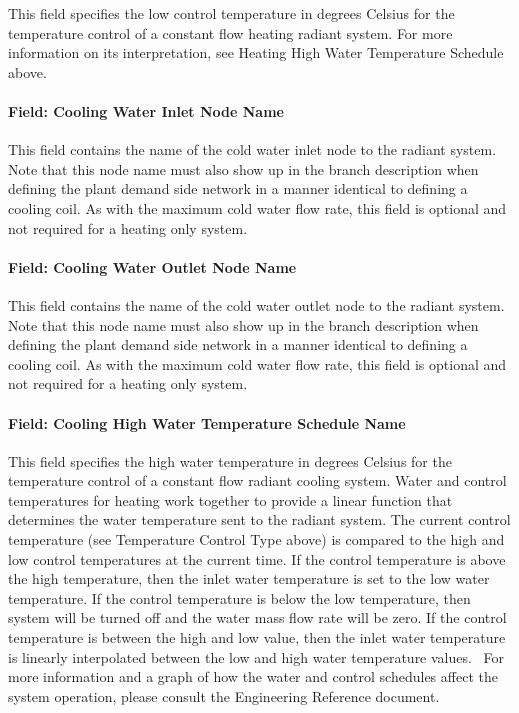 This field specifies the low control temperature in degrees Celsius for the temperature control of a constant flow heating radiant system. For more information on its interpretation, see Heating High Water Temperature Schedule above.

\paragraph{Field: Cooling Water Inlet Node Name}\label{field-cooling-water-inlet-node-name-1}

This field contains the name of the cold water inlet node to the radiant system. Note that this node name must also show up in the branch description when defining the plant demand side network in a manner identical to defining a cooling coil. As with the maximum cold water flow rate, this field is optional and not required for a heating only system.

\paragraph{Field: Cooling Water Outlet Node Name}\label{field-cooling-water-outlet-node-name-1}

This field contains the name of the cold water outlet node to the radiant system. Note that this node name must also show up in the branch description when defining the plant demand side network in a manner identical to defining a cooling coil. As with the maximum cold water flow rate, this field is optional and not required for a heating only system.

\paragraph{Field: Cooling High Water Temperature Schedule Name}\label{field-cooling-high-water-temperature-schedule-name}

This field specifies the high water temperature in degrees Celsius for the temperature control of a constant flow radiant cooling system. Water and control temperatures for heating work together to provide a linear function that determines the water temperature sent to the radiant system. The current control temperature (see Temperature Control Type above) is compared to the high and low control temperatures at the current time. If the control temperature is above the high temperature, then the inlet water temperature is set to the low water temperature. If the control temperature is below the low temperature, then system will be turned off and the water mass flow rate will be zero. If the control temperature is between the high and low value, then the inlet water temperature is linearly interpolated between the low and high water temperature values.~ For more information and a graph of how the water and control schedules affect the system operation, please consult the Engineering Reference document.

